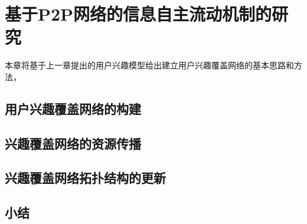 \section{基于P2P网络的信息自主流动机制的研究}
本章将基于上一章提出的用户兴趣模型给出建立用户兴趣覆盖网络的基本思路和方法，

\subsection{用户兴趣覆盖网络的构建}
\subsection{兴趣覆盖网络的资源传播}
\subsection{兴趣覆盖网络拓扑结构的更新}
\subsection{小结}

